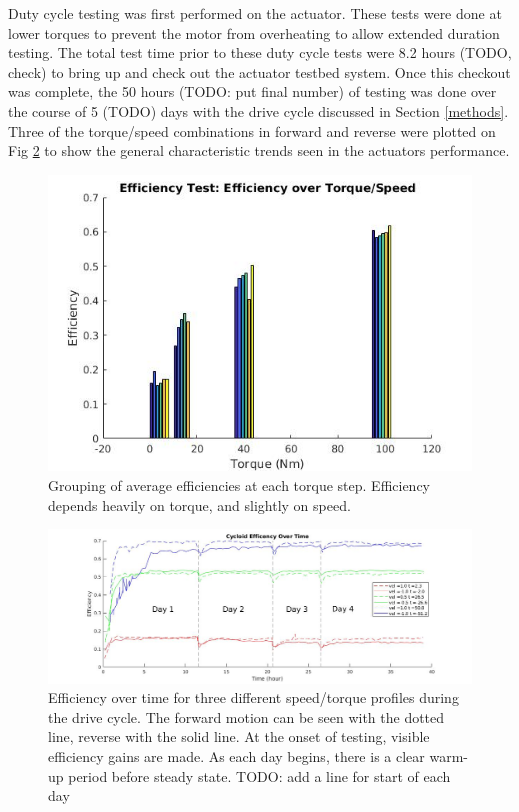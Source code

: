\documentclass[letterpaper, 10 pt, conference]{ieeeconf}  %
\begin{document}
Duty cycle testing was first performed on the actuator. These tests were done at lower torques to prevent the motor from overheating to allow extended duration testing. The total test time prior to these duty cycle tests were 8.2 hours (TODO, check) to bring up and check out the actuator testbed system. Once this checkout was complete, the 50 hours (TODO: put final number) of testing was done over the course of 5 (TODO) days with the drive cycle discussed in Section \ref{methods}. Three of the torque/speed combinations in forward and reverse were plotted on Fig \ref{long_run} to show the general characteristic trends seen in the actuators performance. 

   \begin{figure}[!b]
      \centering
      \includegraphics[width=\linewidth]{eff_test_bar_plot_v1}
      \caption{Grouping of average efficiencies at each torque step. Efficiency depends heavily on torque, and slightly on speed.}
      \label{eff_results}
   \end{figure}
   
   \begin{figure}[t]
      \centering
      \includegraphics[width=\linewidth]{long_run_plot_v2}
      \caption{Efficiency over time for three different speed/torque profiles during the drive cycle. The forward motion can be seen with the dotted line, reverse with the solid line. At the onset of testing, visible efficiency gains are made. As each day begins, there is a clear warm-up period before steady state. TODO: add a line for start of each day}
      \label{long_run}
   \end{figure}
   
\end{document}
